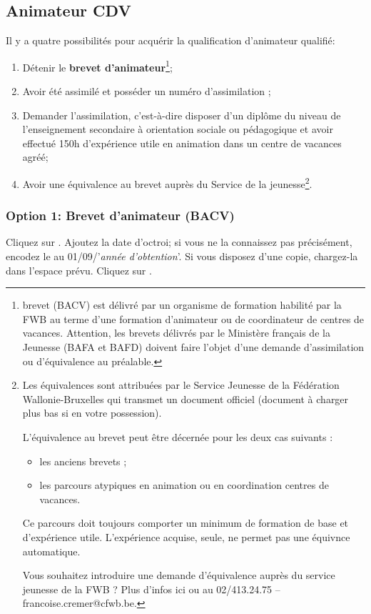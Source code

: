 \subsection{Animateur CDV}\label{ssec:animateur_cdv}
Il y a quatre possibilités pour acquérir la qualification d'animateur qualifié:
\begin{enumerate}
    \item Détenir le \textbf{brevet d'animateur}\footnote{\label{note:bacv} brevet (BACV) est délivré par un organisme de formation habilité par la FWB au terme d’une formation d’animateur ou de coordinateur de centres de vacances. Attention, les brevets délivrés par le Ministère français de la Jeunesse (BAFA et BAFD) doivent faire l’objet d’une demande d’assimilation ou d'équivalence au préalable.};
    \item Avoir été assimilé et posséder un numéro d'assimilation ;
    \item Demander l'assimilation, c'est-à-dire disposer d'un diplôme du niveau de l'enseignement secondaire à orientation sociale ou pédagogique et avoir effectué 150h d'expérience utile en animation dans un centre de vacances agréé;
    \item Avoir une équivalence au brevet auprès du Service de la jeunesse\footnote{\label{note:equivalence_cdv}Les équivalences sont attribuées par le Service Jeunesse de la Fédération Wallonie-Bruxelles qui transmet un document officiel (document à charger plus bas si en votre possession).

L'équivalence au brevet peut être décernée pour les deux cas suivants :
\begin{itemize}
    \item les anciens brevets ;
    \item les parcours atypiques en animation ou en coordination centres de vacances.
\end{itemize}

Ce parcours doit toujours comporter un minimum de formation de base et d'expérience utile. L’expérience acquise, seule, ne permet pas une équivnce automatique.

Vous souhaitez introduire une demande d’équivalence auprès du service jeunesse de la FWB ? Plus d’infos ici ou au 02/413.24.75 – francoise.cremer@cfwb.be.}.
\end{enumerate}



\subsubsection{Option 1: Brevet d'animateur (BACV)}
Cliquez sur . Ajoutez la date d'octroi; si vous ne la connaissez pas précisément, encodez le au 01/09/'\textit{année d'obtention}'. Si vous disposez d'une copie, chargez-la dans l'espace prévu. Cliquez sur . 
    
